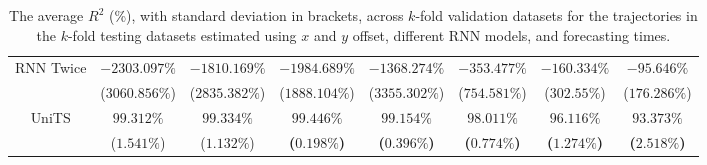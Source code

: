 \begin{table}[!ht]
{\begin{tabular}{|c|c|c|c|c|c|c|c|}
			\multirow{2}{*}{RNN Twice} & $-2303.097\%$ & $-1810.169\%$ & $-1984.689\%$ & $-1368.274\%$ & $-353.477\%$ & $-160.334\%$ & $-95.646\%$ \\
			 & ($3060.856\%$) & ($2835.382\%$) & ($1888.104\%$) & ($3355.302\%$) & ($754.581\%$) & ($302.55\%$) & ($176.286\%$) \\ \hline
			\multirow{2}{*}{UniTS} & $99.312\%$ & $99.334\%$ & $\mathbf{99.446\%}$ & $\mathbf{99.154\%}$ & $\mathbf{98.011\%}$ & $\mathbf{96.116\%}$ & $\mathbf{93.373\%}$ \\
			 & ($1.541\%$) & ($1.132\%$) & \textbf{(}$\mathbf{0.198\%}$\textbf{)} & \textbf{(}$\mathbf{0.396\%}$\textbf{)} & \textbf{(}$\mathbf{0.774\%}$\textbf{)} & \textbf{(}$\mathbf{1.274\%}$\textbf{)} & \textbf{(}$\mathbf{2.518\%}$\textbf{)} \\ \hline
		\end{tabular}
	}
	\caption{The average $R^{2}$ (\%), with standard deviation in brackets, across $k$-fold validation datasets for the trajectories in the $k$-fold testing datasets estimated using $x$ and $y$ offset, different RNN models, and forecasting times.}
	\label{tab:all_no_abs_R2}
\end{table}

